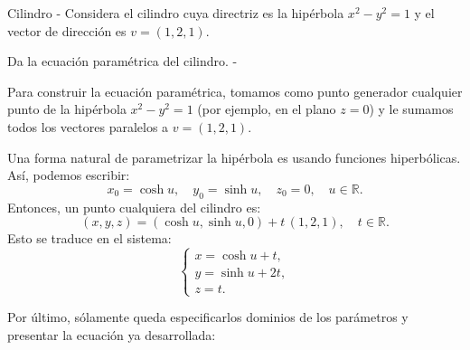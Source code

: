 \documentclass[11pt,letterpaper]{article}
\begin{document}
\begin{inciso} {Cilindro}
- Considera el cilindro cuya directriz es la hipérbola \( x^2 - y^2 = 1 \) y el vector de dirección es \( v = (1, 2, 1) \).

\begin{problema}{Da la ecuación paramétrica del cilindro.}
- 

Para construir la ecuación paramétrica, tomamos como punto generador cualquier punto de la hipérbola \(x^2 - y^2 = 1\) (por ejemplo, en el plano \(z=0\)) y le sumamos todos los vectores paralelos a \(v=(1,2,1)\).

Una forma natural de parametrizar la hipérbola es usando funciones hiperbólicas. Así, podemos escribir:
\[
x_0=\cosh u,\quad y_0=\sinh u,\quad z_0=0,\quad u\in\mathbb{R}.
\]
Entonces, un punto cualquiera del cilindro es:
\[
(x,y,z)=(\cosh u,\sinh u,0)+t\,(1,2,1),\quad t\in\mathbb{R}.
\]
Esto se traduce en el sistema:
\[
\begin{cases}
x=\cosh u + t,\\[1mm]
y=\sinh u + 2t,\\[1mm]
z=t.
\end{cases}
\]

Por último, sólamente queda especificarlos dominios de los parámetros y presentar la ecuación ya desarrollada: 
\\\\


\end{problema}
\end{inciso}
\end{document}
